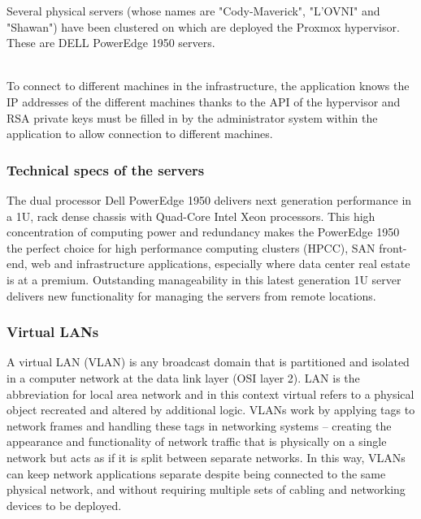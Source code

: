 \pagebreak

Several physical servers (whose names are "Cody-Maverick", "L'OVNI" and "Shawan") have been clustered on which are deployed the Proxmox hypervisor. These are DELL PowerEdge 1950 servers.

\\

To connect to different machines in the infrastructure, the application
knows the IP addresses of the different machines thanks to the API of
the hypervisor and RSA private keys must be filled in by the administrator
system within the application to allow connection to
different machines.

\vspace{1cm}
\subsubsection{Technical specs of the servers}

The dual processor Dell PowerEdge 1950 delivers next generation performance in a 1U, rack dense chassis with Quad-Core Intel Xeon processors. This high concentration of computing power and redundancy makes the PowerEdge 1950 the perfect choice for high performance computing clusters (HPCC), SAN front-end, web and infrastructure applications, especially where data center real estate is at a premium. Outstanding manageability in this latest generation 1U server delivers new functionality for managing the servers from remote locations.

\vspace{1cm}
\subsubsection{Virtual LANs}

A virtual LAN (VLAN) is any broadcast domain that is partitioned and isolated in a computer network at the data link layer (OSI layer 2). LAN is the abbreviation for local area network and in this context virtual refers to a physical object recreated and altered by additional logic. VLANs work by applying tags to network frames and handling these tags in networking systems – creating the appearance and functionality of network traffic that is physically on a single network but acts as if it is split between separate networks. In this way, VLANs can keep network applications separate despite being connected to the same physical network, and without requiring multiple sets of cabling and networking devices to be deployed.


